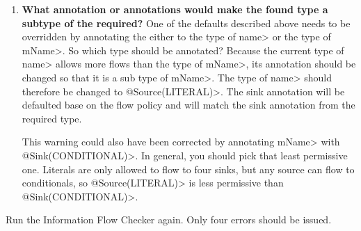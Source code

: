 \begin{enumerate}
\item\textbf{What annotation or annotations would make the found type a subtype of the required?}
One of the defaults described above needs to be overridden by annotating the 
 either to the type of \<name> or the type of \<mName>. So which type should be 
 annotated? Because the current type of \<name> allows more flows than the type
 of \<mName>, its annotation should be changed so that it is a sub type of \<mName>.
  The type of \<name> should therefore be changed to \<@Source(LITERAL)>. The 
  sink annotation will be defaulted base on the flow policy and will match the 
  sink annotation from the required type.


 This warning could also have been corrected by annotating \<mName> with \<@Sink(CONDITIONAL)>.
   In general, you should pick that least permissive one.  Literals are only 
   allowed to flow to four sinks, but any source can flow to conditionals, so
 \<@Source(LITERAL)> is less permissive than \<@Sink(CONDITIONAL)>.
 \end{enumerate}
 Run the Information Flow Checker again.  Only four errors should be issued.
 
